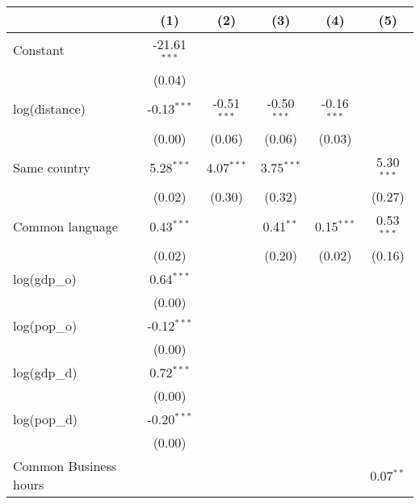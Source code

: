 
\begingroup
\centering
\small
\begin{tabular}{lccccc}
   \toprule
                            & (1)            & (2)           & (3)           & (4)           & (5)\\  
   \midrule 
   Constant                 & -21.61$^{***}$ &               &               &               &   \\   
                            & (0.04)         &               &               &               &   \\   
   log(distance)            & -0.13$^{***}$  & -0.51$^{***}$ & -0.50$^{***}$ & -0.16$^{***}$ &   \\   
                            & (0.00)         & (0.06)        & (0.06)        & (0.03)        &   \\   
   Same country             & 5.28$^{***}$   & 4.07$^{***}$  & 3.75$^{***}$  &               & 5.30$^{***}$\\   
                            & (0.02)         & (0.30)        & (0.32)        &               & (0.27)\\   
   Common language          & 0.43$^{***}$   &               & 0.41$^{**}$   & 0.15$^{***}$  & 0.53$^{***}$\\   
                            & (0.02)         &               & (0.20)        & (0.02)        & (0.16)\\   
   log(gdp\_o)              & 0.64$^{***}$   &               &               &               &   \\   
                            & (0.00)         &               &               &               &   \\   
   log(pop\_o)              & -0.12$^{***}$  &               &               &               &   \\   
                            & (0.00)         &               &               &               &   \\   
   log(gdp\_d)              & 0.72$^{***}$   &               &               &               &   \\   
                            & (0.00)         &               &               &               &   \\   
   log(pop\_d)              & -0.20$^{***}$  &               &               &               &   \\   
                            & (0.00)         &               &               &               &   \\   
   Common Business hours    &                &               &               &               & 0.07$^{**}$\\   

\end{tabular}
